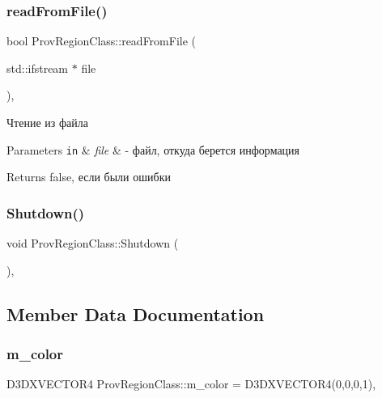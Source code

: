 \subsubsection{\texorpdfstring{read\+From\+File()}{readFromFile()}}
{\footnotesize\ttfamily bool Prov\+Region\+Class\+::read\+From\+File (\begin{DoxyParamCaption}\item[{std\+::ifstream $\ast$}]{file }\end{DoxyParamCaption})\hspace{0.3cm}{\ttfamily [protected]}, {\ttfamily [inherited]}}



Чтение из файла 


\begin{DoxyParams}[1]{Parameters}
\mbox{\tt in}  & {\em file} & -\/ файл, откуда берется информация \\
\hline
\end{DoxyParams}
\begin{DoxyReturn}{Returns}
false, если были ошибки 
\end{DoxyReturn}
\mbox{\label{class_prov_region_class_adf3f702c865e613515590fb928a5eaf1}} 
\subsubsection{\texorpdfstring{Shutdown()}{Shutdown()}}
{\footnotesize\ttfamily void Prov\+Region\+Class\+::\+Shutdown (\begin{DoxyParamCaption}{ }\end{DoxyParamCaption})\hspace{0.3cm}{\ttfamily [virtual]}, {\ttfamily [inherited]}}



\subsection{Member Data Documentation}
\mbox{\label{class_prov_region_class_a8782e9c8135dbf5f89f0b0b64649a129}} 
\subsubsection{\texorpdfstring{m\+\_\+color}{m\_color}}
{\footnotesize\ttfamily D3\+D\+X\+V\+E\+C\+T\+O\+R4 Prov\+Region\+Class\+::m\+\_\+color = D3\+D\+X\+V\+E\+C\+T\+O\+R4(0,0,0,1)\hspace{0.3cm}{\ttfamily [protected]}, {\ttfamily [inherited]}}



